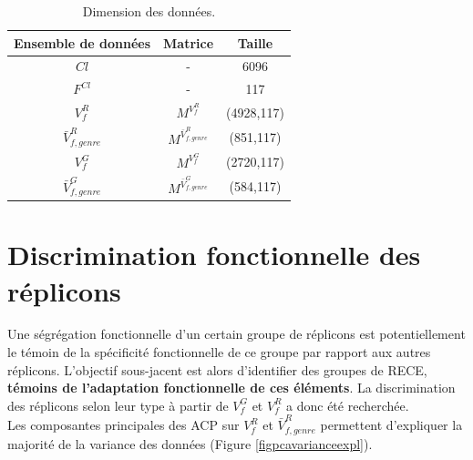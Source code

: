 \begin{table}[H]
	\caption[Dimension des données fonctionnelles]{Dimension des données.}\label{tabdim2}
	\begin{center}
	\begin{tabular}{c|c|c}
	\textbf{Ensemble de données} & \textbf{Matrice} & \textbf{Taille} \\
	\hline
	$Cl$ & - & 6096 \\
	$F^{Cl}$ & - & 117 \\
	$V^{R}_{f} $ & $M^{V^{R}_{f}}$ & (4928,117)  \\
	$\bar{V}^{R}_{f,genre} $ & $M^{\bar{V}^{R}_{f,genre}}$ & (851,117)  \\
	$V^{G}_{f} $ & $M^{V^{G}_{f}}$ & (2720,117)  \\
	$\bar{V}^{G}_{f,genre}$ & $M^{\bar{V}^{G}_{f,genre}}$ & (584,117)  \\
	\end{tabular}
	\end{center}
\end{table}	

	 
\section{Discrimination fonctionnelle des réplicons} \label{pardiscriminfuncrepl}  
	Une ségrégation fonctionnelle d'un certain groupe de réplicons est potentiellement le témoin de la spécificité fonctionnelle de ce groupe par rapport aux autres réplicons. L'objectif sous-jacent est alors d'identifier des groupes de RECE, \textbf{témoins de l'adaptation fonctionnelle de ces éléments}. La discrimination des réplicons selon leur type à partir de $V^{G}_{f}$ et $V^{R}_{f}$ a donc été recherchée. \\
	 Les composantes principales des ACP sur $V^{R}_{f}$ et $\bar{V}^{R}_{f,genre}$ permettent d'expliquer la majorité de la variance des données (Figure \ref{figpcavarianceexpl}). \\

